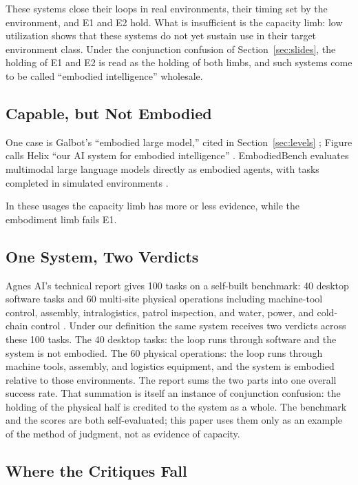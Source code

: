 \documentclass[10pt]{article}
\begin{document}
These systems close their loops in real environments, their timing set by the environment, and E1 and E2 hold. What is insufficient is the capacity limb: low utilization shows that these systems do not yet sustain use in their target environment class. Under the conjunction confusion of Section~\ref{sec:slides}, the holding of E1 and E2 is read as the holding of both limbs, and such systems come to be called ``embodied intelligence'' wholesale.

\subsection{Capable, but Not Embodied}\label{sec:notembodied}

One case is Galbot's ``embodied large model,'' cited in Section~\ref{sec:levels} \cite{galbot}; Figure calls Helix ``our AI system for embodied intelligence'' \cite{figure_seriesc}. EmbodiedBench evaluates multimodal large language models directly as embodied agents, with tasks completed in simulated environments \cite{yang2025embodiedbench}.

In these usages the capacity limb has more or less evidence, while the embodiment limb fails E1.

\subsection{One System, Two Verdicts}\label{sec:agnes}

Agnes AI's technical report gives 100 tasks on a self-built benchmark: 40 desktop software tasks and 60 multi-site physical operations including machine-tool control, assembly, intralogistics, patrol inspection, and water, power, and cold-chain control \cite{agnestr2026}. Under our definition the same system receives two verdicts across these 100 tasks. The 40 desktop tasks: the loop runs through software and the system is not embodied. The 60 physical operations: the loop runs through machine tools, assembly, and logistics equipment, and the system is embodied relative to those environments. The report sums the two parts into one overall success rate. That summation is itself an instance of conjunction confusion: the holding of the physical half is credited to the system as a whole. The benchmark and the scores are both self-evaluated; this paper uses them only as an example of the method of judgment, not as evidence of capacity.

\subsection{Where the Critiques Fall}\label{sec:critiques}
\end{document}
